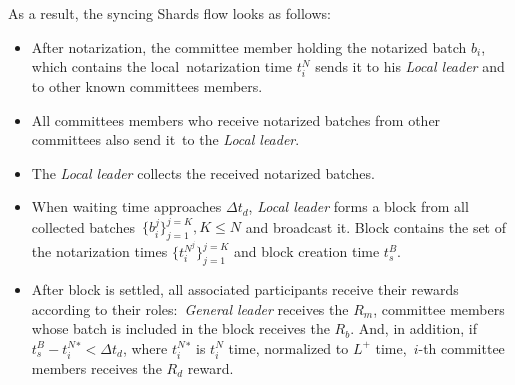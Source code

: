 As a result, the syncing Shards flow looks as follows:
\begin{itemize}
    \item After notarization, the committee member holding the notarized batch $b_i$, which contains the local\
    notarization time $t^N_i$ sends it to his \emph{Local leader} and to other known committees members.
    \item All committees members who receive notarized batches from other committees also send it\
    to the \emph{Local leader}.
    \item The \emph{Local leader} collects the received notarized batches.
    \item When waiting time approaches $\Delta t_d$, \emph{Local leader} forms a block from all collected batches\
    ${\{b_i^j\}_{j=1}^{j=K}, K \le N}$ and broadcast it.
    Block contains the set of the notarization times $\{t^{N^j}_i\}_{j=1}^{j=K}$ and block creation time $t^B_s$.
    \item After block is settled, all associated participants receive their rewards according to their roles:\
    \emph{General leader} receives the $R_m$, committee members whose batch is included in the block receives the $R_b$.
    And, in addition, if ${t^B_s - t^N_i^* < \Delta t_d}$, where $t^N_i^*$ is $t^N_i$ time, normalized to $L^+$ time,\
    $i$-th committee members receives the $R_d$ reward.
\end{itemize}
